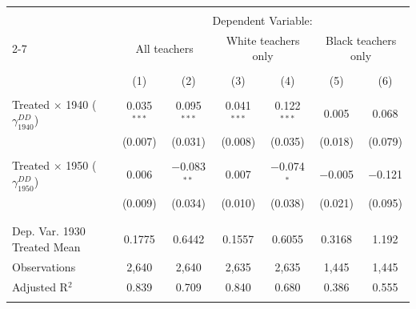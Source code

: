 
\begin{tabular}{@{\extracolsep{5pt}}lcccccc} 
\\[-1.8ex]\hline 
\hline \\[-1.8ex] 
 & \multicolumn{6}{c}{Dependent Variable:} \\ 
\cline{2-7} 
 & \multicolumn{2}{c}{All teachers} & \multicolumn{2}{c}{White teachers only} & \multicolumn{2}{c}{Black teachers only} \\ 
\\[-1.8ex] & (1) & (2) & (3) & (4) & (5) & (6)\\ 
\hline \\[-1.8ex] 
 Treated $\times$ 1940 ($\gamma_{1940}^{DD}$) & 0.035$^{***}$ & 0.095$^{***}$ & 0.041$^{***}$ & 0.122$^{***}$ & 0.005 & 0.068 \\ 
  & (0.007) & (0.031) & (0.008) & (0.035) & (0.018) & (0.079) \\ 
  & & & & & & \\ 
 Treated $\times$ 1950 ($\gamma_{1950}^{DD}$) & 0.006 & $-$0.083$^{**}$ & 0.007 & $-$0.074$^{*}$ & $-$0.005 & $-$0.121 \\ 
  & (0.009) & (0.034) & (0.010) & (0.038) & (0.021) & (0.095) \\ 
  & & & & & & \\ 
\hline \\[-1.8ex] 
Dep. Var. 1930 Treated Mean & 0.1775 & 0.6442 & 0.1557 & 0.6055 & 0.3168 & 1.192 \\ 
Observations & 2,640 & 2,640 & 2,635 & 2,635 & 1,445 & 1,445 \\ 
Adjusted R$^{2}$ & 0.839 & 0.709 & 0.840 & 0.680 & 0.386 & 0.555 \\ 
\hline 
\hline \\[-1.8ex] 
\end{tabular} 
